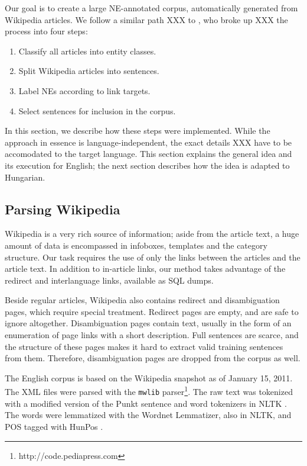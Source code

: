 \documentclass[11pt]{article}
\begin{document}
Our goal is to create a large NE-annotated corpus, automatically generated from Wikipedia articles. We follow a similar path XXX to \cite{Nothman:08}, who broke up XXX the process into four steps:

\begin{enumerate}
\item Classify all articles into entity classes.
\item Split Wikipedia articles into sentences.
\item Label NEs according to link targets.
\item Select sentences for inclusion in the corpus.
\end{enumerate}

In this section, we describe how these steps were implemented. While the approach in essence is language-independent, the exact details XXX have to be accomodated to the target language. This section explains the general idea and its execution for English; the next section describes how the idea is adapted to Hungarian.

\subsection{Parsing Wikipedia}

Wikipedia is a very rich source of information; aside from the article text, a huge amount of data is encompassed in infoboxes, templates and the category structure. Our task requires the use of only the links between the articles and the article text. In addition to in-article links, our method takes advantage of the redirect and interlanguage links, available as SQL dumps.

Beside regular articles, Wikipedia also contains redirect and disambiguation pages, which require special treatment. Redirect pages are empty, and are safe to ignore altogether. Disambiguation pages contain text, usually in the form of an enumeration of page links with a short description. Full sentences are scarce, and the structure of these pages makes it hard to extract valid training sentences from them. Therefore, disambiguation pages are dropped from the corpus as well.

The English corpus is based on the Wikipedia snapshot as of January 15, 2011. The XML files were parsed with the \texttt{mwlib} parser\footnote{http://code.pediapress.com}. The raw text was tokenized with a modified version of the Punkt sentence and word tokenizers \cite{Kiss:06} in NLTK \cite{Loper:02}. The words were lemmatized with the Wordnet Lemmatizer, also in NLTK, and POS tagged with HunPos \cite{Halacsy:07}.
\end{document}
